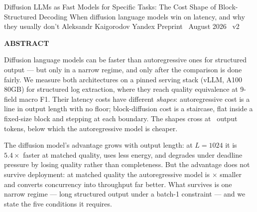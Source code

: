 \documentclass[11pt]{article}
\begin{document}
\papertitle
  {Diffusion LLMs as Fast Models for Specific Tasks: The Cost Shape of Block-Structured Decoding}
  {When diffusion language models win on latency, and why they usually don't}
  {Aleksandr Kaigorodov}
  {Yandex}
  {Preprint \textperiodcentered\ August 2026 \textperiodcentered\ v2}

\begingroup
\small
\noindent
{\sffamily\bfseries\footnotesize\color{deepink}ABSTRACT}\par
\vspace{3pt}
\noindent
Diffusion language models can be faster than autoregressive ones for
structured output --- but only in a narrow regime, and only after the
comparison is done fairly. We measure both architectures on a pinned serving
stack (vLLM, A100 80GB) for structured log extraction, where they reach
quality equivalence at 9-field macro F1. Their latency costs have different
\emph{shapes}: autoregressive cost is a line in output length with no floor;
block-diffusion cost is a staircase, flat inside a fixed-size block and
stepping at each boundary. The shapes cross at \crossoverL\ output tokens,
below which the autoregressive model is cheaper.

The diffusion model's advantage grows with output length: at $L{=}1024$ it is
$5.4\times$ faster at matched quality, uses less energy, and degrades under
deadline pressure by losing quality rather than completeness. But the advantage
does not survive deployment: at matched quality the autoregressive model is
\footprintRatio$\times$ smaller and converts concurrency into throughput far
better. What survives is one narrow regime --- long structured output under a
batch-1 constraint --- and we state the five conditions it requires.
\endgroup

\vspace{6pt}
\end{document}
